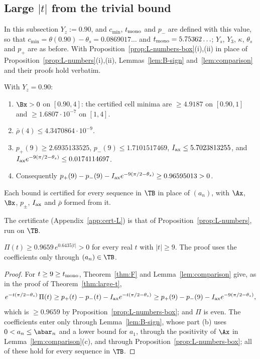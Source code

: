 \subsection{Large \texorpdfstring{$|t|$}{|t|} from the trivial bound}\label{ssec:large-t-box}

In this subsection $Y_z:=0.90$, and $c_{\min}$, $t_{\rm mono}$ and $p_-$ are defined with this value, so that $c_{\min}=\theta(0.90)-\theta_s=0.0869017\ldots$
and $t_{\rm mono}=5.75362\ldots$; $Y_s$, $Y_3$, $\kappa$, $\theta_s$ and $p_+$ are as before. With Proposition~\ref{prop:L-numbers-box}(i),(ii) in
place of Proposition~\ref{prop:L-numbers}(i),(ii), Lemmas~\ref{lem:B-sign} and~\ref{lem:comparison} and their proofs hold verbatim.

\begin{proposition}\label{prop:L-numbers-box}
With $Y_z=0.90$:
\begin{enumerate}[label=\textup{(\roman*)}]
\item $\Bx>0$ on $[0.90,4]$: the certified cell minima are $\ge4.9187$ on $[0.90,1]$ and $\ge1.6807\cdot10^{-7}$ on $[1,4]$.
\item $\bar\rho(4)\le4.3470864\cdot10^{-9}$.
\item $p_+(9)\ge2.6935133525$, $p_-(9)\le1.7101517469$, $I_{\rm ax}\le5.7023813255$, and $I_{\rm ax}e^{-9(\pi/2-\theta_s)}\le0.0174114697$.
\item Consequently $p_+(9)-p_-(9)-I_{\rm ax}e^{-9(\pi/2-\theta_s)}\ge0.96595013>0$.
\end{enumerate}
Each bound is certified for every sequence in $\TB$ in place of $(a_n)$, with $\Ax$, $\Bx$, $p_\pm$, $I_{\rm ax}$ and $\bar\rho$ formed from it.
\end{proposition}

The certificate (Appendix~\ref{app:cert-L}) is that of Proposition~\ref{prop:L-numbers}, run on $\TB$.

\begin{theorem}\label{thm:large-t-box}
$\Pi(t)\ge0.9659\,e^{0.6435|t|}>0$ for every real $t$ with $|t|\ge9$. The proof uses the coefficients only through $(a_n)\in\TB$.
\end{theorem}

\begin{proof}
For $t\ge9\ge t_{\rm mono}$, Theorem~\ref{thm:F} and Lemma~\ref{lem:comparison} give, as in the proof of Theorem~\ref{thm:large-t},
\[
e^{-t(\pi/2-\theta_s)}\,\Pi(t)\ge p_+(t)-p_-(t)-I_{\rm ax}e^{-t(\pi/2-\theta_s)}\ge p_+(9)-p_-(9)-I_{\rm ax}e^{-9(\pi/2-\theta_s)},
\]
which is $\ge0.9659$ by Proposition~\ref{prop:L-numbers-box}; and $\Pi$ is even. The coefficients enter only through Lemma~\ref{lem:B-sign}, whose
part (b) uses $0<a_n\le\abar_n$ and a lower bound for $a_1$, through the positivity of $\Ax$ in Lemma~\ref{lem:comparison}(c), and through
Proposition~\ref{prop:L-numbers-box}; all of these hold for every sequence in $\TB$.
\end{proof}

